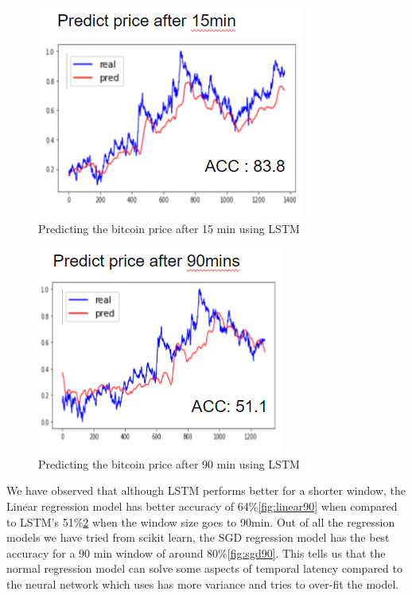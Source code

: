 \documentclass[final]{cvpr}
\begin{document}
\begin{figure}[h!]
\begin{center}
\caption{Predicting the bitcoin price after 15 min using LSTM}
\includegraphics[width=0.8\linewidth]{latex/LSTM_15.PNG}
\end{center}
\label{fig:LSTM15}
\end{figure}

\begin{figure}[h!]
\begin{center}
\caption{Predicting the bitcoin price after 90 min using LSTM}
\includegraphics[width=0.8\linewidth]{latex/LSTM_90.PNG}
\end{center}
\label{fig:LSTM90}
\end{figure}

We have observed that although LSTM performs better for a shorter window, the Linear regression model has better accuracy of 64\%\ref{fig:linear90} when compared to LSTM's 51\%\ref{fig:LSTM90} when the window size goes to 90min. Out of all the regression models we have tried from scikit learn, the SGD regression model has the best accuracy for a 90 min window of around 80\%\ref{fig:sgd90}. This tells us that the normal regression model can solve some aspects of temporal latency compared to the neural network which uses has more variance and tries to over-fit the model.
\end{document}
